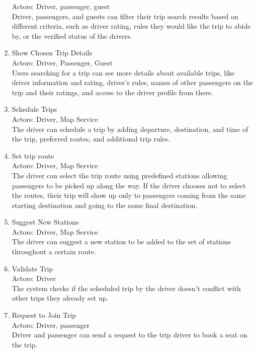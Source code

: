 \documentclass[a4paper, 12pt]{report} %
\begin{document}
\begin{enumerate}
                    Actors: Driver, passenger, guest \\
                    Driver, passengers, and guests can filter their trip search results based on different criteria, such as driver rating, rules they would like the trip to abide by, or the verified status of the drivers.
                \item Show Chosen Trip Details \\ 
                    Actors: Driver, Passenger, Guest \\ 
                    Users searching for a trip can see more details about available trips, like driver information and rating, driver’s rules, names of other passengers on the trip and their ratings, and access to the driver profile from there.
                \item Schedule Trips \\
                    Actors: Driver, Map Service \\
                    The driver can schedule a trip by adding departure, destination, and time of the trip, preferred routes, and additional trip rules.
                \item Set trip route \\
                    Actors: Driver, Map Service \\
                    The driver can select the trip route using predefined stations allowing passengers to be picked up along the way. If the driver chooses not to select the routes, their trip will show up only to passengers coming from the same starting destination and going to the same final destination.
                \item Suggest New Stations \\
                    Actors: Driver, Map Service \\
                    The driver can suggest a new station to be added to the set of stations throughout a certain route.
                \item Validate Trip \\
                    Actors: Driver \\
                    The system checks if the scheduled trip by the driver doesn't conflict with other trips they already set up. 
                \item Request to Join Trip \\
                    Actors: Driver, passenger \\
                    Driver and passenger can send a request to the trip driver to book a seat on the trip.

\end{enumerate}
\end{document}
